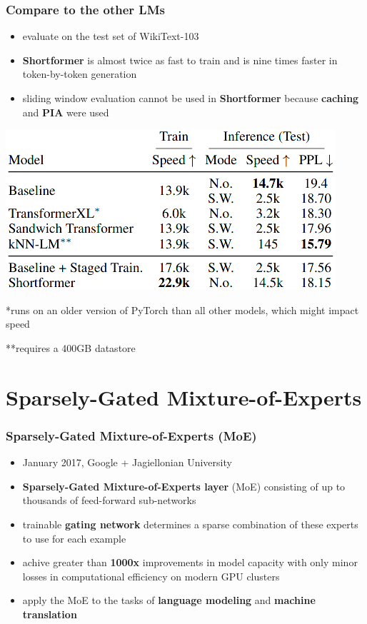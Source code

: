 \documentclass{beamer}
\begin{document}
\begin{frame}
    \frametitle{Compare to the other LMs}
    \begin{center}
        \begin{itemize}
            \item evaluate on the test set of WikiText-103
            \item \textbf{Shortformer} is almost twice as fast to train and is nine times faster in token-by-token generation
            \item sliding window evaluation cannot be used in \textbf{Shortformer} because \textbf{caching} and \textbf{PIA} were used
        \end{itemize}

        \includegraphics[scale=0.44]{img/shortformer_compare_with_other_models.png}

        \tiny{*runs on an older version of PyTorch than all other models, which might impact speed}

        \tiny{**requires a 400GB datastore}
    \end{center}
\end{frame}



\section{Sparsely-Gated Mixture-of-Experts}
\begin{frame}
    \frametitle{Sparsely-Gated Mixture-of-Experts (MoE) \cite{moe_layer}}
    \begin{itemize}
        \item January 2017, Google + Jagiellonian University
        \item \textbf{Sparsely-Gated Mixture-of-Experts layer} (MoE) consisting of up to thousands of feed-forward sub-networks
        \item trainable \textbf{gating network} determines a sparse combination of these experts to use for each example
        \item achive greater than \textbf{1000x} improvements in model capacity with only minor losses in computational efficiency on modern GPU clusters
        \item apply the MoE to the tasks of \textbf{language modeling} and \textbf{machine translation}
    \end{itemize}
\end{frame}
\end{document}

